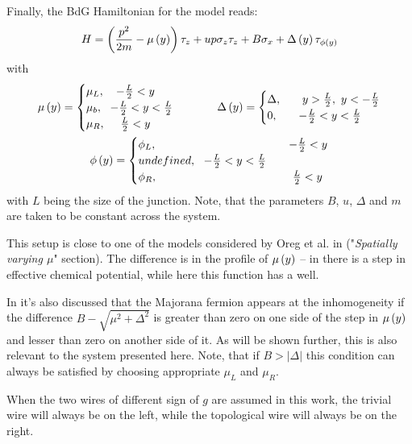 Finally, the BdG Hamiltonian for the model reads:
\begin{equation}
\label{full_hamiltonian}
H
=
\left(
	\frac{p^2}{2m}
	-\mu\left(y\right)
\right)\tau_z
+
u p \sigma_z \tau_z
+
B\sigma_x	
+
\Delta\left(y\right)\tau_{\phi\left(y\right)}
\end{equation}
with
\begin{gather}
\label{full_hamiltonian_suppl}
	\mu\left(y\right)
	=
	\begin{cases}
		\mu_L,~~~  -\frac{L}{2}<y\\
		\mu_b,~~ -\frac{L}{2} <y <\frac{L}{2}\\
		\mu_R, ~~~~ \frac{L}{2}< y  
	\end{cases}
	~~~~~~~~
	\Delta\left(y\right)
	=
	\begin{cases}
		\Delta,&~~~  y>\frac{L}{2},~y<-\frac{L}{2}\\
		0,
		&~~ -\frac{L}{2} <y <\frac{L}{2}\\
	\end{cases}
		\\
	\phi\left(y\right)
	=
	\begin{cases}
	\phi_L,&~~~  -\frac{L}{2}<y\\
	undefined,~~ -\frac{L}{2} <y <\frac{L}{2}\\
	\phi_R, &~~~~ \frac{L}{2}< y 
	\end{cases}
\end{gather}
with $ L $ being the size of the junction. Note, that the parameters $ B $, $ u $, $ \Delta $ and $ m $ are taken to be constant across the system.
 
  This setup is close to one of the models  considered by Oreg et al. in \cite{Oreg_2010} ("\textit{Spatially varying $ \mu $}" section). The difference is in the profile of $ \mu\left(y\right) $ -- in \cite{Oreg_2010}  there is a step in effective chemical potential, while here this function has a well.  
  
 In \cite{Oreg_2010} it's also discussed that the Majorana fermion appears at the inhomogeneity if the difference $ B-\sqrt{\mu^2+\Delta^2} $ is greater than zero on one side of the step in $ \mu\left(y\right) $ and lesser than zero on another side of it. As will be shown further, this is also relevant to the  system presented here. Note, that if $ B > \left|\Delta\right| $ this condition can always be satisfied by choosing appropriate $ \mu_L $ and $ \mu_R $. 
 
 When the two wires of different sign of $ g $ are assumed in this work, the trivial wire will always be on the left, while the topological wire will always be on the right.

